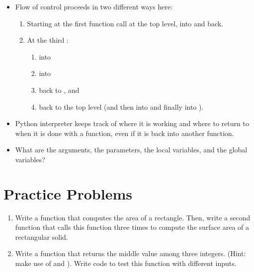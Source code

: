 \documentclass[letterpaper,10pt,english]{sphinxmanual}
\begin{document}
\begin{itemize}
\item {} 
Flow of control proceeds in two different ways here:
\begin{enumerate}
\def\theenumi{\arabic{enumi}}
\def\labelenumi{\theenumi .}
\makeatletter\def\p@enumii{\p@enumi \theenumi .}\makeatother
\item {} 
Starting at the first  function call at the top
level, into  and back.

\item {} 
At the third :
\begin{enumerate}
\def\theenumii{\arabic{enumii}}
\def\labelenumii{\theenumii .}
\makeatletter\def\p@enumiii{\p@enumii \theenumii .}\makeatother
\item {} 
into 

\item {} 
into 

\item {} 
back to , and

\item {} 
back to the top level (and then into  and
finally into ).

\end{enumerate}

\end{enumerate}

\item {} 
Python interpreter keeps track of where it is working and where
to return to when it is done with a function, even if it is back into
another function.

\item {} 
What are the arguments, the parameters, the local variables, and the
global variables?

\end{itemize}


\section{Practice Problems}
\label{\detokenize{lecture_notes/lec05_functions2:practice-problems}}\begin{enumerate}
\def\theenumi{\arabic{enumi}}
\def\labelenumi{\theenumi .}
\makeatletter\def\p@enumii{\p@enumi \theenumi .}\makeatother
\item {} 
Write a function that computes the area of a rectangle. Then, write
a second function that calls this function three times to
compute the surface area of a rectangular solid.

\item {} 
Write a function that returns the middle value among three
integers.  (Hint: make use of  and ).  Write
code to test this function with different inputs.

\end{enumerate}
\end{document}
